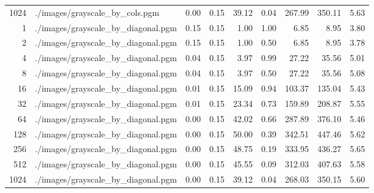 \begin{table}[H]
\begin{adjustbox}{width=\textwidth, keepaspectratio}
\begin{tabular}{rlrrrrrrr}
                        1024 &     ./images/grayscale\_by\_cols.pgm &     0.00 &     0.15 &    39.12 &        0.04 &   267.99 &                    350.11 &                    5.63 \\
                           1 & ./images/grayscale\_by\_diagonal.pgm &     0.15 &     0.15 &     1.00 &        1.00 &     6.85 &                      8.95 &                    3.80 \\
                           2 & ./images/grayscale\_by\_diagonal.pgm &     0.15 &     0.15 &     1.00 &        0.50 &     6.85 &                      8.95 &                    3.78 \\
                           4 & ./images/grayscale\_by\_diagonal.pgm &     0.04 &     0.15 &     3.97 &        0.99 &    27.22 &                     35.56 &                    5.01 \\
                           8 & ./images/grayscale\_by\_diagonal.pgm &     0.04 &     0.15 &     3.97 &        0.50 &    27.22 &                     35.56 &                    5.08 \\
                          16 & ./images/grayscale\_by\_diagonal.pgm &     0.01 &     0.15 &    15.09 &        0.94 &   103.37 &                    135.04 &                    5.43 \\
                          32 & ./images/grayscale\_by\_diagonal.pgm &     0.01 &     0.15 &    23.34 &        0.73 &   159.89 &                    208.87 &                    5.55 \\
                          64 & ./images/grayscale\_by\_diagonal.pgm &     0.00 &     0.15 &    42.02 &        0.66 &   287.89 &                    376.10 &                    5.46 \\
                         128 & ./images/grayscale\_by\_diagonal.pgm &     0.00 &     0.15 &    50.00 &        0.39 &   342.51 &                    447.46 &                    5.62 \\
                         256 & ./images/grayscale\_by\_diagonal.pgm &     0.00 &     0.15 &    48.75 &        0.19 &   333.95 &                    436.27 &                    5.65 \\
                         512 & ./images/grayscale\_by\_diagonal.pgm &     0.00 &     0.15 &    45.55 &        0.09 &   312.03 &                    407.63 &                    5.58 \\
                        1024 & ./images/grayscale\_by\_diagonal.pgm &     0.00 &     0.15 &    39.12 &        0.04 &   268.03 &                    350.15 &                    5.60 \\

\end{tabular}
\end{adjustbox}
\end{table}
